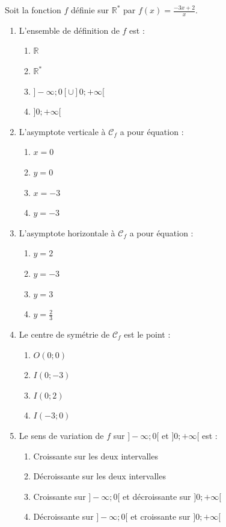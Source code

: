 \documentclass[11pt]{article}
\begin{document}
\begin{exercice}
Soit la fonction $f$ définie sur $\mathbb{R}^*$ par $f(x) = \frac{-3x+2}{x}$.
\begin{enumerate}
    \item L'ensemble de définition de $f$ est :
    \begin{enumerate}
        \item $\mathbb{R}$ \item $\mathbb{R}^*$ \item $]-\infty;0[ \cup ]0;+\infty[$ \item $]0;+\infty[$
    \end{enumerate}
    \item L'asymptote verticale à $\mathcal{C}_f$ a pour équation :
    \begin{enumerate}
        \item $x=0$ \item $y=0$ \item $x=-3$ \item $y=-3$
    \end{enumerate}
    \item L'asymptote horizontale à $\mathcal{C}_f$ a pour équation :
    \begin{enumerate}
        \item $y=2$ \item $y=-3$ \item $y=3$ \item $y=\frac{2}{3}$
    \end{enumerate}
    \item Le centre de symétrie de $\mathcal{C}_f$ est le point :
    \begin{enumerate}
        \item $O(0;0)$ \item $I(0;-3)$ \item $I(0;2)$ \item $I(-3;0)$
    \end{enumerate}
    \item Le sens de variation de $f$ sur $]-\infty;0[$ et $]0;+\infty[$ est :
    \begin{enumerate}
        \item Croissante sur les deux intervalles \item Décroissante sur les deux intervalles
        \item Croissante sur $]-\infty;0[$ et décroissante sur $]0;+\infty[$
        \item Décroissante sur $]-\infty;0[$ et croissante sur $]0;+\infty[$
    \end{enumerate}
\end{enumerate}
\end{exercice}
\end{document}
